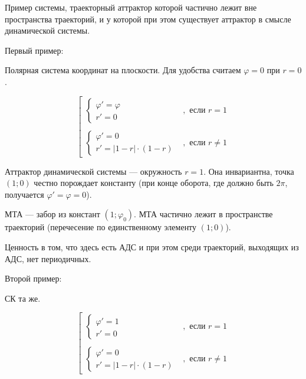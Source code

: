 
\LARGE



Пример системы, траекторный аттрактор которой частично лежит вне пространства траекторий,
и у которой при этом существует аттрактор в смысле динамической системы.

Первый пример:

Полярная система координат на плоскости.
Для удобства считаем $\varphi = 0$ при $r=0$.

\begin{equation}
	\left\lbrack
		\begin{array}{ll}
			\left\{
				\begin{array}{l}
					\varphi ' = \varphi
				\\
					r' = 0
				\end{array}
			\right.
			& , \mbox{~если~} r = 1
			\\\\
			\left\{
				\begin{array}{l}
					\varphi ' = 0
				\\
					r' = |1-r| \cdot (1-r)
				\end{array}
			\right.
			& , \mbox{~если~} r \neq 1
		\end{array}
	\right.
\end{equation}

Аттрактор динамической системы --- окружность $r = 1$.
Она инвариантна, точка $(1; 0)$ честно порождает константу
(при конце оборота, где должно быть $2\pi$, получается $\varphi' = \varphi = 0$).

МТА --- забор из констант $(1;\varphi_0)$.
МТА частично лежит в пространстве траекторий
(перечесение по единственному элементу $(1; 0)$).

Ценность в том, что здесь есть АДС и при этом среди траекторий, выходящих из АДС, нет периодичных.

Второй пример:

СК та же.

\begin{equation}
	\left\lbrack
		\begin{array}{ll}
			\left\{
				\begin{array}{l}
					\varphi ' = 1
				\\
					r' = 0
				\end{array}
			\right.
			& , \mbox{~если~} r = 1
			\\\\
			\left\{
				\begin{array}{l}
					\varphi ' = 0
				\\
					r' = |1-r| \cdot (1-r)
				\end{array}
			\right.
			& , \mbox{~если~} r \neq 1
		\end{array}
	\right.
\end{equation}

